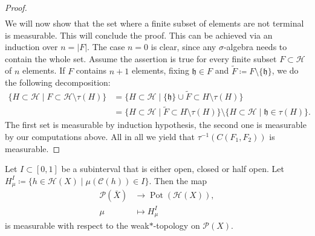 \begin{proof}
\begin{align*}
  \end{align*}
  We will now show that the set where a finite subset of elements are not terminal is measurable. This will conclude the proof. This can be achieved via an induction over \(n = |F|\). The case \(n = 0\) is clear, since any \(\sigma\)-algebra needs to contain the whole set. Assume the assertion is true for every finite subset \(F \subset \mathcal{H}\) of \(n\) elements. If \(F\) contains \(n+1\) elements, fixing \(\mathfrak{h} \in F\) and \(\tilde F \coloneqq F \setminus \{\mathfrak{h}\}\), we do the following decomposition:
  \begin{align*}
    \{H \subset \mathcal{H} \mid F \subset \mathcal{H} \setminus \tau(H)\}
    & = \{H \subset \mathcal{H} \mid \{\mathfrak{h}\} \cup \tilde F \subset H \setminus \tau(H)\}\\
    & = \{H \subset \mathcal{H} \mid \tilde{F} \subset H \setminus \tau(H)\} \setminus \{H \subset \mathcal{H} \mid \mathfrak{h} \in \tau(H)\}.
  \end{align*}
  The first set is measurable by induction hypothesis, the second one is measurable by our computations above. All in all we yield that \(\tau^{-1}(C(F_1, F_2))\) is measurable.
\end{proof}


\begin{lemma}[{\cites[Lemma~ A.1]{MR3509968}}]
  \label{lem:measurable-mu}
  Let \(I \subset [0,1]\) be a subinterval that is either open, closed or half open. Let \(H^I_\mu \coloneqq \{h \in \mathcal{H}(X) \mid \mu(\mathcal{C}(h)) \in I\}\). Then the map
  \begin{align*}
    \mathcal{P}(\bar X) &\to \operatorname{Pot}(\mathcal{H}(X)),\\
    \mu &\mapsto H^I_\mu
  \end{align*}
  is measurable with respect to the weak\(\ast\)-topology on \(\mathcal{P}(X)\).
\end{lemma}

